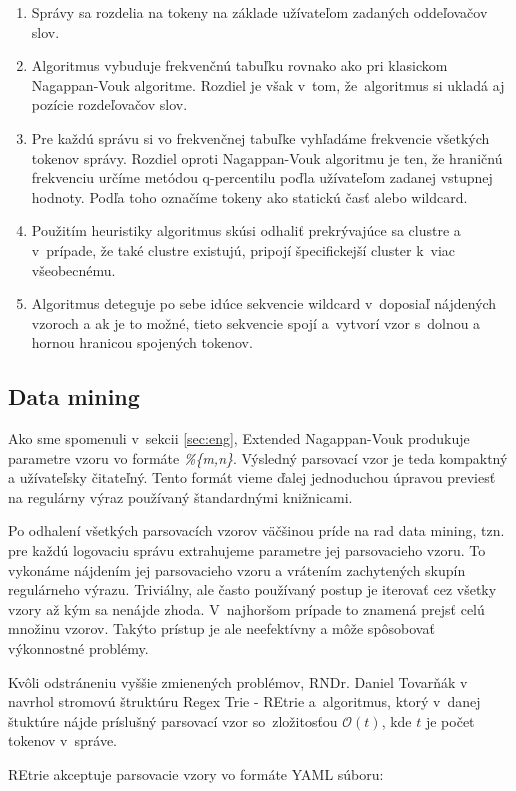 \begin{enumerate}
 \item Správy sa rozdelia na tokeny na základe užívateľom zadaných oddeľovačov slov.
 \item Algoritmus vybuduje frekvenčnú tabuľku rovnako ako pri klasickom Nagappan-Vouk algoritme. Rozdiel je však v~tom, že~algoritmus si ukladá aj pozície rozdeľovačov slov.
 \item Pre každú správu si vo frekvenčnej tabuľke vyhľadáme frekvencie všetkých tokenov správy. Rozdiel oproti Nagappan-Vouk algoritmu je ten, že hraničnú frekvenciu určíme metódou q-per\-centilu poďla užívateľom zadanej vstupnej hodnoty. Podľa toho označíme tokeny ako statickú časť alebo wildcard.
 \item Použitím heuristiky algoritmus skúsi odhaliť prekrývajúce sa clustre a v~prípade, že také clustre existujú, pripojí špecifickejší cluster k~viac všeobecnému.
 \item Algoritmus deteguje po sebe idúce sekvencie wildcard v~doposiaľ nájdených vzoroch a ak je to možné, tieto sekvencie spojí a~vytvorí
 vzor s~dolnou a hornou hranicou spojených tokenov.
\end{enumerate}

\subsection{Data mining}
\label{sec:data-mining}
Ako sme spomenuli v~sekcii \ref{sec:eng}, Extended Nagappan-Vouk produkuje parametre vzoru vo formáte \emph{\%\{m,n\}}. Výsledný parsovací vzor je teda kompaktný a užívateľsky čitateľný.  Tento formát vieme ďalej jednoduchou úpravou previesť na regulárny výraz používaný štandardnými knižnicami.
\par Po odhalení všetkých parsovacích vzorov väčšinou príde na rad data mining, tzn. pre každú logovaciu správu extrahujeme parametre jej parsovacieho vzoru. To vykonáme nájdením jej parsovacieho vzoru a vrátením zachytených skupín regulárneho výrazu. Triviálny, ale často používaný postup je iterovať cez všetky vzory až kým sa nenájde zhoda. V~najhoršom prípade to znamená prejsť celú množinu vzorov. Takýto prístup je ale neefektívny a môže spôsobovať výkonnostné problémy.
\par Kvôli odstráneniu vyššie zmienených problémov, RNDr. Daniel Tovarňák v~\parencite{regextrie} navrhol stromovú štruktúru Regex Trie - REtrie a~algoritmus, ktorý v~danej štuktúre nájde príslušný parsovací vzor so~zložitosťou $\mathcal{O}(t)$, kde $t$ je počet tokenov v~správe.
\par REtrie akceptuje parsovacie vzory vo formáte YAML súboru:


